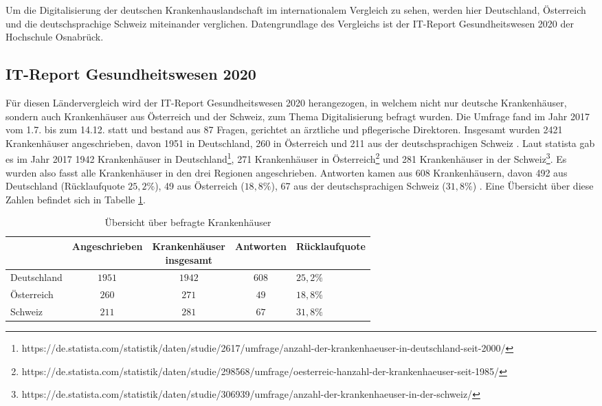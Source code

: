 Um die Digitalisierung der deutschen Krankenhauslandschaft im internationalem Vergleich zu sehen, werden hier Deutschland, Österreich und die deutschsprachige Schweiz miteinander verglichen. Datengrundlage des Vergleichs ist der IT-Report Gesundheitswesen 2020 der Hochschule Osnabrück.
\subsection{IT-Report Gesundheitswesen 2020}
Für diesen Ländervergleich wird der IT-Report Gesundheitswesen 2020 herangezogen, in welchem nicht nur deutsche Krankenhäuser, sondern auch Krankenhäuser aus Österreich und der Schweiz, zum Thema Digitalisierung befragt wurden. Die Umfrage fand im Jahr 2017 vom 1.7. bis zum 14.12. statt und bestand aus 87 Fragen, gerichtet an ärztliche und pflegerische Direktoren. Insgesamt wurden 2421 Krankenhäuser angeschrieben, davon 1951 in Deutschland, 260 in Österreich und 211 aus der deutschsprachigen Schweiz \parencite{huebner2020}. Laut statista gab es im Jahr 2017 1942 Krankenhäuser in Deutschland\footnote{https://de.statista.com/statistik/daten/studie/2617/umfrage/anzahl-der-krankenhaeuser-in-deutschland-seit-2000/}, 271 Krankenhäuser in Österreich\footnote{https://de.statista.com/statistik/daten/studie/298568/umfrage/oesterreic-hanzahl-der-krankenhaeuser-seit-1985/} und 281 Krankenhäuser in der Schweiz\footnote{https://de.statista.com/statistik/daten/studie/306939/umfrage/anzahl-der-krankenhaeuser-in-der-schweiz/}. Es wurden also fasst alle Krankenhäuser in den drei Regionen angeschrieben. Antworten kamen aus 608 Krankenhäusern, davon 492 aus Deutschland (Rücklaufquote $25,2\%$), 49 aus Österreich ($18,8\%$), 67 aus der deutschsprachigen Schweiz ($31,8\%$) . Eine Übersicht über diese Zahlen befindet sich in Tabelle \ref{tab:anzahl-krankenhaeuser}. 
\begin{table}[h]
\begin{center}
	\begin{tabular}{l|c|c|c|l}
		&Angeschrieben&\parbox[c]{13ex}{\centering Krankenhäuser\\ insgesamt}&Antworten&Rücklaufquote\\
		\hline
		Deutschland&$1951$&$1942$&$608$&$25,2\%$\\
		Österreich&$260$&$271$&$49$&$18,8\%$\\
		Schweiz&$211$&$281$&$67$&$31,8\%$\\
	\end{tabular}
\end{center}
\caption{Übersicht über befragte Krankenhäuser}	
\label{tab:anzahl-krankenhaeuser}
\end{table}

